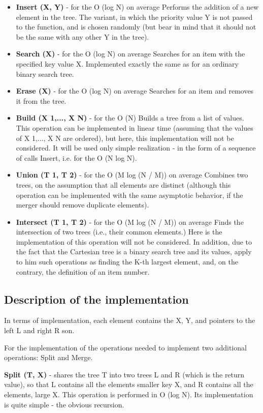\begin{itemize}
\item \textbf{Insert (X, Y)} - for the O (log N) on average 
Performs the addition of a new element in the tree. 
The variant, in which the priority value Y is not passed to the function, and is chosen randomly (but bear in mind that it should not be the same with any other Y in the tree).
\item \textbf{Search (X)} - for the O (log N) on average 
Searches for an item with the specified key value X. Implemented exactly the same as for an ordinary binary search tree.
\item \textbf{Erase (X)} - for the O (log N) on average 
Searches for an item and removes it from the tree.
\item \textbf{Build (X 1,..., X N)} - for the O (N) 
Builds a tree from a list of values. This operation can be implemented in linear time (assuming that the values ​​of X 1,..., X N are ordered), but here, this implementation will not be considered. 
It will be used only simple realization - in the form of a sequence of calls Insert, i.e. for the O (N log N).
\item \textbf{Union (T 1, T 2)} - for the O (M log (N / M)) on average 
Combines two trees, on the assumption that all elements are distinct (although this operation can be implemented with the same asymptotic behavior, if the merger should remove duplicate elements).
\item \textbf{Intersect (T 1, T 2)} - for the O (M log (N / M)) on average 
Finds the intersection of two trees (i.e., their common elements.) Here is the implementation of this operation will not be considered.
In addition, due to the fact that the Cartesian tree is a binary search tree and its values, apply to him such operations as finding the K-th largest element, and, on the contrary, the definition of an item number.

\end{itemize}

\subsection{ Description of the implementation }
In terms of implementation, each element contains the X, Y, and pointers to the left L and right R son.

For the implementation of the operations needed to implement two additional operations: Split and Merge.

\textbf{Split (T, X)} - shares the tree T into two trees L and R (which is the return value), so that L contains all the elements smaller key X, and R contains all the elements, large X. This operation is performed in O (log N). Its implementation is quite simple - the obvious recursion.

